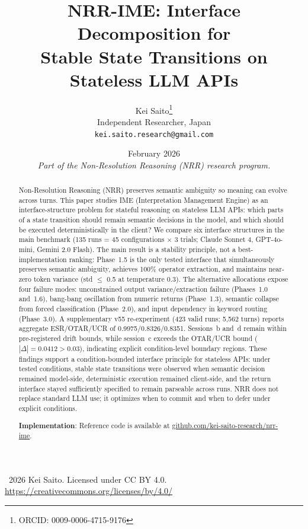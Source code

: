 \documentclass[11pt,a4paper]{article}
\title{\textbf{NRR-IME: Interface Decomposition for\\Stable State Transitions on Stateless LLM APIs}}
\author{
  Kei Saito\thanks{ORCID: 0009-0006-4715-9176} \\
  Independent Researcher, Japan \\
  \texttt{kei.saito.research@gmail.com}
}
\date{February 2026 \\[0.5em]
\textit{Part of the Non-Resolution Reasoning (NRR) research program.}}
\begin{document}
\maketitle

\begin{center}
\textcopyright\ 2026 Kei Saito.
Licensed under CC BY 4.0.\\
\url{https://creativecommons.org/licenses/by/4.0/}
\end{center}

\begin{abstract}
Non-Resolution Reasoning (NRR) preserves semantic ambiguity so meaning can evolve
across turns. This paper studies IME (Interpretation Management Engine) as an
interface-structure problem for stateful reasoning on stateless LLM APIs: which
parts of a state transition should remain semantic decisions in the model, and
which should be executed deterministically in the client? We compare six
interface structures in the main benchmark (135 runs = 45 configurations
$\times$ 3 trials; Claude Sonnet 4, GPT-4o-mini, Gemini 2.0 Flash). The main
result is a stability principle, not a best-implementation ranking: Phase~1.5
is the only tested interface that simultaneously preserves semantic ambiguity,
achieves 100\% operator extraction, and maintains near-zero token variance (std
$\leq$ 0.5 at temperature 0.3). The alternative allocations expose four
failure modes: unconstrained output variance/extraction failure (Phases~1.0
and~1.6), bang-bang oscillation from numeric returns (Phase~1.3), semantic
collapse from forced classification (Phase~2.0), and input dependency in keyword
routing (Phase~3.0). A supplementary v55 re-experiment (423 valid runs; 5{,}562
turns) reports aggregate ESR/OTAR/UCR of 0.9975/0.8326/0.8351. Sessions~b and~d
remain within pre-registered drift bounds, while session~c exceeds the OTAR/UCR
bound ($|\Delta|=0.0412 > 0.03$), indicating explicit condition-level boundary
regions. These findings support a condition-bounded interface principle for
stateless APIs: under tested conditions, stable state transitions were observed
when semantic decision remained model-side, deterministic execution remained
client-side, and the return interface stayed sufficiently specified to remain
parseable across runs. NRR does not replace standard LLM use; it optimizes when
to commit and when to defer under explicit conditions.

\textbf{Implementation}: Reference code is available at
\href{https://github.com/kei-saito-research/nrr-ime}{github.com/kei-saito-research/nrr-ime}.
\end{abstract}
\end{document}
